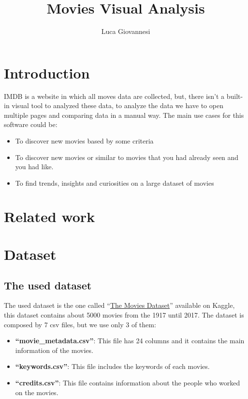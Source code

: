 \documentclass[]{article}
\title{Movies Visual Analysis}
\author{Luca Giovannesi}
\newcommand{\quotes}[1]{``#1''}
\begin{document}
\maketitle

\section{Introduction}
IMDB is a website in which all moves data are collected, but, there isn't a built-in visual tool to analyzed these data, to analyze the data we have to open multiple pages and comparing data in a manual way.\newline
The main use cases for this software could be:
\begin{itemize}
	\item To discover new movies based by some criteria
	\item To discover new movies or similar to movies that you had already seen and you had like.
	\item To find trends, insights and curiosities on a large dataset of movies
\end{itemize}
\section{Related work}
\section{Dataset}
\subsection{The used dataset}
The used dataset is the one called \quotes{\href{https://www.kaggle.com/datasets/rounakbanik/the-movies-dataset}{The Movies Dataset}} available on Kaggle, this dataset contains about 5000 movies from the 1917 until 2017.\newline
The dataset is composed by 7 csv files, but we use only 3 of them:
\begin{itemize}
	\item \textbf{\quotes{movie\_metadata.csv}}: This file has 24 columns and it contains the main information of the movies.
	\item \textbf{\quotes{keywords.csv}}: This file includes the keywords of each movies.
	\item \textbf{\quotes{credits.csv}}: This file contains information about the people who worked on the movies. 
\end{itemize}
\end{document}
